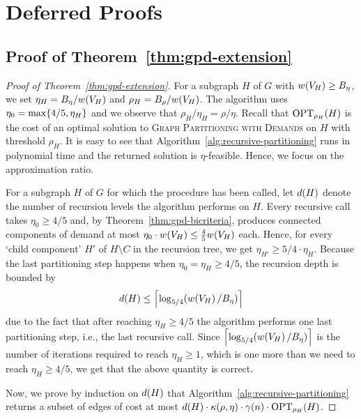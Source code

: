 \section{Deferred Proofs}\label{app:missing-proofs}

\subsection{Proof of Theorem~\ref{thm:gpd-extension}}\label{app:gpd-extension}
\begin{proof}[Proof of Theorem~\ref{thm:gpd-extension}]
    For a subgraph $H$ of $G$ with $w\br{V_H}\geq B_\eta$, we set $\eta_H=B_\eta/w\br{V_H}$ and $\rho_H=B_\rho/w\br{V_H}$. The algorithm uses $\eta_0=\max\brc{4/5,\eta_H}$ and we observe that $\rho_H/\eta_H=\rho/\eta$.
    Recall that $\OPTdem{H}{\rho_H}$ is the cost of an optimal solution to \textsc{Graph Partitioning with Demands} on $H$ with threshold $\rho_H$.
    It is easy to see that Algorithm~\ref{alg:recursive-partitioning} runs in polynomial time and the returned solution is $\eta$-feasible. Hence, we focus on the approximation ratio.

For a subgraph $H$ of $G$ for which the procedure has been called, let $d\br{H}$ denote the number of recursion levels the algorithm performs on $H$. Every recursive call takes $\eta_0\geq 4/5$ and, by Theorem~\ref{thm:gpd-bicriteria}, produces connected components of demand at most $\eta_0 \cdot w\br{V_H}\leq \frac{4}{5} w\br{V_H}$ each.
Hence, for every `child component' $H'$ of $H\setminus C$ in the recursion tree, we get $\eta_{H'}\geq 5/4\cdot \eta_H$.
Because the last partitioning step happens when $\eta_0=\eta_H\geq 4/5$, the recursion depth is bounded by
\[
    d\br{H}\leq \cl{\log_{5/4}\br{w\br{V_H}/B_\eta}}
\]
due to the fact that after reaching $\eta_{H}\geq 4/5$ the algorithm performs one last partitioning step, i.e., the last recursive call. Since $\cl{\log_{5/4}\br{w\br{V_H}/B_\eta}}$ is the number of iterations required to reach $\eta_H\geq 1$, which is one more than we need to reach $\eta_H\geq 4/5$, we get that the above quantity is correct.

Now, we prove by induction on $d\br{H}$ that Algorithm~\ref{alg:recursive-partitioning} returns a subset of edges of cost at most $d\br{H}\cdot \kappa\br{\rho,\eta}\cdot \gamma\br{n}\cdot \OPTdem{H}{\rho_H}$.


\end{proof}
